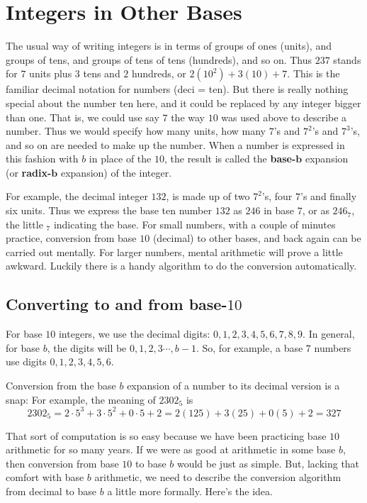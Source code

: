 \chapter{Integers in Other Bases}

The usual way of
writing integers is in terms of groups of ones (units), and groups of
tens, and groups of tens of tens (hundreds), and so on. Thus $237$
stands for $7$ units plus $3$ tens and $2$ hundreds, or
$2(10^2)+3(10)+7$.  This is the familiar decimal notation for numbers
(deci = ten). But there is really nothing special about the number ten
here, and it could be replaced by any integer bigger than one. That is,
we could use say $7$ the way $10$ was used above to describe a number. Thus we
would specify how many units, how many $7$'s
and $7^2$'s and $7^3$'s, and so on are needed to make up the
number. When a number is expressed in this fashion with $b$ in place
of the $10$, the result is called the {\bfseries base-$\mathbf{b}$} expansion
(or {\bfseries radix-$\mathbf{b}$} expansion) of the integer.

For example, the decimal integer $132$,   is made up
of two $7^2$'s, four $7$'s and finally six units. Thus we express the
base ten number $132$ as $246$ in base $7$, or as $246_7$, the little
$_7$ indicating the base. For small numbers, with a couple of minutes
practice, conversion from base $10$ (decimal) to other
bases, and back again can be carried out mentally.  For larger numbers, mental
arithmetic 
will prove a little awkward. Luckily there is a handy algorithm
to do the conversion automatically.  

\section{Converting to and from base-$10$}
For base $10$ integers, we use the decimal digits: $0,1,2,3,4,5,6,7,8,9$.
In general, for base $b$, the digits will be $0,1,2,3\cdots,b-1$. So, for example,
a base $7$ numbers use digits $0,1,2,3,4,5,6$.


Conversion from the base $b$ expansion of a number to its decimal version
is a snap: For example, the meaning of $2302_5$
is 
$$
2302_5= 2\cdot5^3+3\cdot5^2+0\cdot5+2 = 2(125)+3(25) +0(5) + 2 = 327
$$

That sort of computation is so easy because we have been practicing base $10$
arithmetic for so many years. If we were as good at arithmetic in some base $b$,
then conversion from base $10$ to base $b$ would be just as simple. But, lacking
that comfort with base $b$ arithmetic, we need to describe the conversion 
algorithm from decimal to base $b$ a little more formally. Here's the idea.

